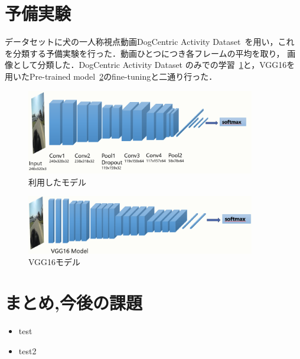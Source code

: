 \documentclass[twocolumn, a4paper]{UECIEresume}
\begin{document}
\section{予備実験}
データセットに犬の一人称視点動画DogCentric Activity Dataset~\cite{yumi2014first}を用い，これを分類する予備実験を行った．動画ひとつにつき各フレームの平均を取り，
画像として分類した．DogCentric Activity Dataset のみでの学習~\ref{model}と，VGG16\cite{vgg16}を用いたPre-trained model~\ref{vgg16model}のfine-tuningと二通り行った．
\begin{figure}[b]
 \includegraphics[width=10cm]{./Img/usemodel.eps}
 \caption{利用したモデル}
 \label{model}
\end{figure}
\begin{figure}[b]
 \includegraphics[width=10cm]{./Img/vgg16model.eps}
 \caption{VGG16モデル}
 \label{vgg16model}
\end{figure}

\section{まとめ,今後の課題}
\begin{itemize}
  \item{test}
  \item{test2}
\end{itemize}

\begin{footnotesize}


\end{footnotesize}
\end{document}
